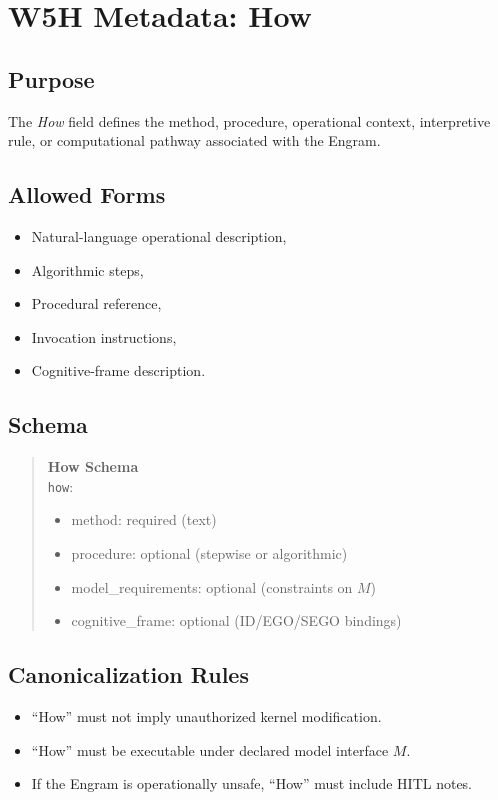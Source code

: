 \chapter{W5H Metadata: How}
\label{chap:W5H_How}

\section{Purpose}

The \emph{How} field defines the method, procedure, operational context,
interpretive rule, or computational pathway associated with the Engram.

\section{Allowed Forms}

\begin{itemize}
    \item Natural-language operational description,
    \item Algorithmic steps,
    \item Procedural reference,
    \item Invocation instructions,
    \item Cognitive-frame description.
\end{itemize}

\section{Schema}

\begin{quote}
\textbf{How Schema}\\
\texttt{how}: 
\begin{itemize}
    \item method: required (text)
    \item procedure: optional (stepwise or algorithmic)
    \item model\_requirements: optional (constraints on $M$)
    \item cognitive\_frame: optional (ID/EGO/SEGO bindings)
\end{itemize}
\end{quote}

\section{Canonicalization Rules}

\begin{itemize}
    \item ``How'' must not imply unauthorized kernel modification.
    \item ``How'' must be executable under declared model interface $M$.
    \item If the Engram is operationally unsafe, ``How'' must include HITL notes.
\end{itemize}
